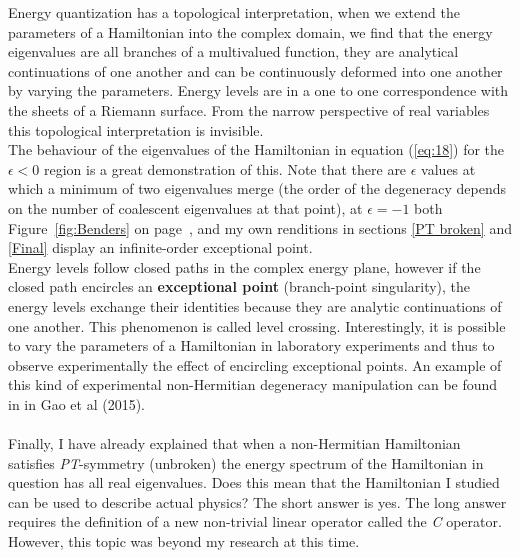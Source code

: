 \documentclass[10pt, a4paper, singlespacing, headsepline]{report}
\newcommand\PT{\emph{PT}}
\begin{document}
Energy quantization has a topological interpretation, when we extend the parameters of a Hamiltonian into the complex domain, we find that the energy eigenvalues are all branches of a multivalued function, they are analytical continuations of one another and can be continuously deformed into one another by varying the parameters. Energy levels are in a one to one correspondence with the sheets of a Riemann surface. From the narrow perspective of real variables this topological interpretation is invisible.\\The behaviour of the eigenvalues of the Hamiltonian in equation (\ref{eq:18}) for the $\epsilon < 0$ region is a great demonstration of this. Note that there are $\epsilon$ values at which a minimum of two eigenvalues merge (the order of the degeneracy depends on the number of coalescent eigenvalues at that point\cite{BenderPT}\cite{Bender2017}), at $\epsilon = -1$ both Figure~\ref{fig:Benders} on page~\pageref{fig:Benders}, and my own renditions in sections \ref{PT broken} and \ref{Final} display an infinite-order exceptional point.\\Energy levels follow closed paths in the complex energy plane, however if the closed path encircles an \textbf{exceptional point} (branch-point singularity), the energy levels exchange their identities because they are analytic continuations of one another\cite{BenderPT}\cite{Bender2017}. This phenomenon is called level crossing. Interestingly, it is possible to vary the parameters of a Hamiltonian in laboratory experiments and thus to observe experimentally the effect of encircling exceptional points\cite{Bender2017}. An example of this kind of experimental non-Hermitian degeneracy manipulation can be found in in Gao et al (2015).\\\\

Finally, I have already explained that when a non-Hermitian Hamiltonian satisfies \PT-symmetry (unbroken) the energy spectrum of the Hamiltonian in question has all real eigenvalues.
Does this mean that the Hamiltonian I studied can be used to describe actual physics? The short answer is yes. The long answer requires the definition of a new non-trivial linear operator called the \emph{C} operator. However, this topic was beyond my research at this time. 

\end{document}
